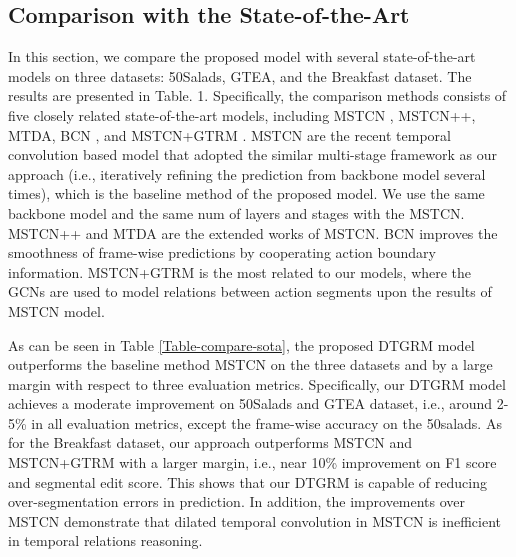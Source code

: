 \documentclass[letterpaper]{article} \usepackage{aaai21}  \usepackage{times}  \usepackage{helvet} \usepackage{courier}  \usepackage[hyphens]{url}  \usepackage{graphicx} \usepackage{mathtools}
\begin{document}
\subsection{Comparison with the State-of-the-Art}
In this section, we compare the proposed model with several state-of-the-art models on three datasets: 50Salads, GTEA, and the Breakfast dataset. The results are presented in Table. 1. Specifically, the comparison methods consists of five closely related state-of-the-art models, including MSTCN \cite{farha2019ms}, MSTCN++\cite{li2020ms}, MTDA\cite{chen2020action},  BCN \cite{wangboundary}, and MSTCN+GTRM \cite{huang2020improving}. MSTCN are the recent temporal convolution based model that adopted the similar multi-stage framework as our approach (i.e., iteratively refining the prediction from backbone model several times), which is the baseline method of the proposed model. We use the same backbone model and the same num of layers and stages with the MSTCN. MSTCN++ and MTDA are the extended works of MSTCN. BCN improves the smoothness of frame-wise predictions by cooperating action boundary information. MSTCN+GTRM is the most related to our models, where the GCNs are used to model relations between action segments upon the results of MSTCN model.

As can be seen in Table \ref{Table-compare-sota}, the proposed DTGRM model outperforms the baseline method MSTCN on the three datasets and by a large margin with respect to three evaluation metrics. Specifically, our DTGRM model achieves a moderate improvement on 50Salads and GTEA dataset, i.e., around 2-5\% in all evaluation metrics, except the frame-wise accuracy on the 50salads. As for the Breakfast dataset, our approach outperforms MSTCN and MSTCN+GTRM with a larger margin, i.e., near 10\% improvement on F1 score and segmental edit score. This shows that our DTGRM is capable of reducing over-segmentation errors in prediction. In addition, the improvements over MSTCN demonstrate that dilated temporal convolution in MSTCN is inefficient in temporal relations reasoning.
\end{document}
